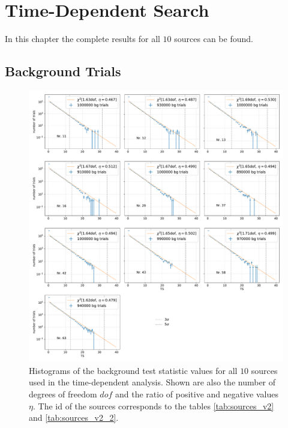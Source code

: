 \section{Time-Dependent Search} \label{sec:time_dep_search_appendix}

In this chapter the complete results for all $\num{10}$ sources can be found.

\subsection{Background Trials}

\begin{figure}
    \centering
    \includegraphics[width=\linewidth-2cm]{Plots/05_csky/9_years_gfu_gold_time_dep_bg_t0.pdf}
    \caption{Histograms of the background test statistic values for all $\num{10}$ sources used in the time-dependent analysis. Shown are also the number of degrees of freedom $dof$ and the ratio of positive and negative values $\eta$. The id of the sources corresponds to the tables \ref{tab:sources_v2} and \ref{tab:sources_v2_2}.}
    \label{fig:bg_trials_time_dep}
\end{figure}

